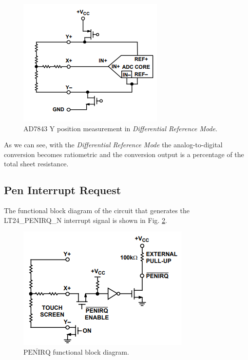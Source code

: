 \documentclass[11pt]{report}
\begin{document}
\begin{figure}[!h]
    \centering
    \includegraphics[width=0.6\linewidth]{images/graphic_interface_design/LT24_touchscreen_driver/ad7843_differential_measurement.png}
    \caption{AD7843 Y position measurement in \textit{Differential Reference Mode}.}
    \label{fig:ad7843_diff_meas}
\end{figure}

As we can see, with the \textit{Differential Reference Mode} the analog-to-digital conversion becomes ratiometric and the conversion output is a percentage of the total sheet resistance.

\subsection{Pen Interrupt Request}\label{ref:penirq}
The functional block diagram of the circuit that generates the LT24\_PENIRQ\_N interrupt signal is shown in Fig. \ref{fig:penirq_circuit}.

\begin{figure}[!h]
    \centering
    \includegraphics[width=0.5\linewidth]{images/graphic_interface_design/LT24_touchscreen_driver/penirq_circuit.png}
    \caption{$\overline{\text{PENIRQ}}$ functional block diagram.}
    \label{fig:penirq_circuit}
\end{figure}
\end{document}
